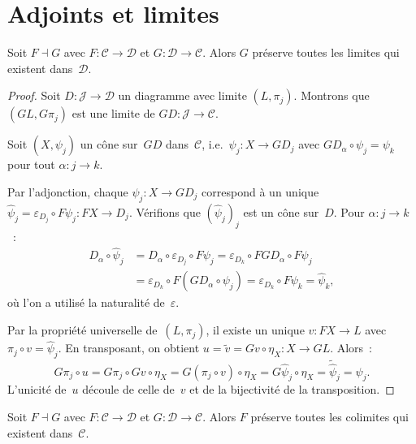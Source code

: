 \section{Adjoints et limites}\label{sec:adjoints-limites}

\begin{theoreme}\label{thm:rapl}
Soit $F\dashv G$ avec $F\colon\mathcal{C}\to\mathcal{D}$ et
$G\colon\mathcal{D}\to\mathcal{C}$.
Alors $G$ préserve toutes les limites qui existent dans~$\mathcal{D}$.
\end{theoreme}

\begin{proof}
Soit $D\colon\mathcal{J}\to\mathcal{D}$ un diagramme avec limite
$(L,\pi_j)$. Montrons que $(GL,G\pi_j)$ est une limite de
$GD\colon\mathcal{J}\to\mathcal{C}$.

Soit $(X,\psi_j)$ un cône sur~$GD$ dans~$\mathcal{C}$,
i.e.\ $\psi_j\colon X\to GD_j$ avec $GD_\alpha\circ\psi_j=\psi_k$
pour tout $\alpha\colon j\to k$.

Par l'adjonction, chaque $\psi_j\colon X\to GD_j$ correspond à un unique
$\hat{\psi}_j = \varepsilon_{D_j}\circ F\psi_j\colon FX\to D_j$.
Vérifions que $(\hat{\psi}_j)_j$ est un cône sur~$D$.
Pour $\alpha\colon j\to k$~:
\begin{align*}
    D_\alpha\circ\hat{\psi}_j
    &= D_\alpha\circ\varepsilon_{D_j}\circ F\psi_j
    = \varepsilon_{D_k}\circ FGD_\alpha\circ F\psi_j \\
    &= \varepsilon_{D_k}\circ F(GD_\alpha\circ\psi_j)
    = \varepsilon_{D_k}\circ F\psi_k = \hat{\psi}_k,
\end{align*}
où l'on a utilisé la naturalité de~$\varepsilon$.

Par la propriété universelle de~$(L,\pi_j)$, il existe un unique
$v\colon FX\to L$ avec $\pi_j\circ v = \hat{\psi}_j$.
En transposant, on obtient $u = \tilde{v} = Gv\circ\eta_X\colon X\to GL$.
Alors~:
\[
    G\pi_j\circ u = G\pi_j\circ Gv\circ\eta_X
    = G(\pi_j\circ v)\circ\eta_X
    = G\hat{\psi}_j\circ\eta_X
    = \widetilde{\hat{\psi}}_j = \psi_j.
\]
L'unicité de~$u$ découle de celle de~$v$ et de la bijectivité de la transposition.
\end{proof}

\begin{theoreme}\label{thm:lapc}
Soit $F\dashv G$ avec $F\colon\mathcal{C}\to\mathcal{D}$ et
$G\colon\mathcal{D}\to\mathcal{C}$.
Alors $F$ préserve toutes les colimites qui existent dans~$\mathcal{C}$.
\end{theoreme}

